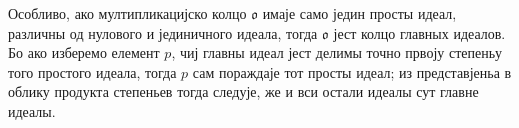 \documentclass[11pt]{article}
\newcommand{\mo}{\mathfrak{o}}
\begin{document}
\setcounter{footnote}{33}

\noindent Особливо, ако мултипликацијско колцо $\mo$ имаје само једин просты идеал, различны од нулового и јединичного идеала, тогда $\mo$ јест колцо главных идеалов. Бо ако изберемо елемент $p$, чиј главны идеал јест делимы точно првоју степеньу того простого идеала, тогда $p$ сам пораждаје тот просты идеал; из представјеньа в облику продукта степеньев тогда следује, же и вси остали идеалы сут главне идеалы.
\end{document}
